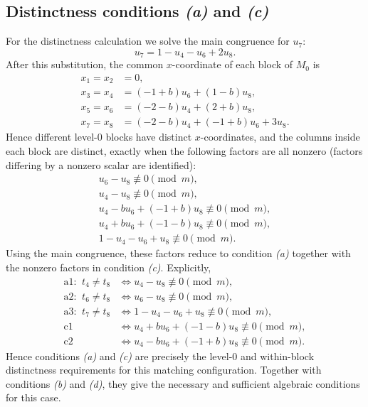 \documentclass[11pt]{article}
\newcommand{\mymod}{\pmod m}
\begin{document}
\subsection{Distinctness conditions \emph{(a)} and \emph{(c)}}
For the distinctness calculation we solve the main congruence for $u_{7}$:
\[
u_{7}=1 - u_{4} - u_{6} + 2u_{8}.
\]
After this substitution, the common $x$-coordinate of each block of $M_0$ is
\[
\begin{aligned}
x_{1}=x_{2}&=0,\\
x_{3}=x_{4}&=\left(-1 + b\right)u_{6} + \left(1 - b\right)u_{8},\\
x_{5}=x_{6}&=\left(-2 - b\right)u_{4} + \left(2 + b\right)u_{8},\\
x_{7}=x_{8}&=\left(-2 - b\right)u_{4} + \left(-1 + b\right)u_{6} + 3u_{8}.
\end{aligned}
\]
Hence different level-$0$ blocks have distinct $x$-coordinates, and the columns inside each block are distinct, exactly when the following factors are all nonzero (factors differing by a nonzero scalar are identified):
\[
\begin{gathered}
u_{6} - u_{8}\not\equiv 0\mymod,\\
u_{4} - u_{8}\not\equiv 0\mymod,\\
u_{4} - bu_{6} + \left(-1 + b\right)u_{8}\not\equiv 0\mymod,\\
u_{4} + bu_{6} + \left(-1 - b\right)u_{8}\not\equiv 0\mymod,\\
1 - u_{4} - u_{6} + u_{8}\not\equiv 0\mymod.
\end{gathered}
\]
Using the main congruence, these factors reduce to condition \emph{(a)} together with the nonzero factors in condition \emph{(c)}.  Explicitly,
\[
\begin{aligned}
\text{a1: }\ t_4 \neq t_8&\Longleftrightarrow u_{4} - u_{8}\not\equiv0\mymod,\\
\text{a2: }\ t_6 \neq t_8&\Longleftrightarrow u_{6} - u_{8}\not\equiv0\mymod,\\
\text{a3: }\ t_7 \neq t_8&\Longleftrightarrow 1 - u_{4} - u_{6} + u_{8}\not\equiv0\mymod,\\
\text{c1}&\Longleftrightarrow u_{4} + bu_{6} + \left(-1 - b\right)u_{8}\not\equiv0\mymod,\\
\text{c2}&\Longleftrightarrow u_{4} - bu_{6} + \left(-1 + b\right)u_{8}\not\equiv0\mymod.
\end{aligned}
\]
Hence conditions \emph{(a)} and \emph{(c)} are precisely the level-$0$ and within-block distinctness requirements for this matching configuration.  Together with conditions \emph{(b)} and \emph{(d)}, they give the necessary and sufficient algebraic conditions for this case.
\end{document}
